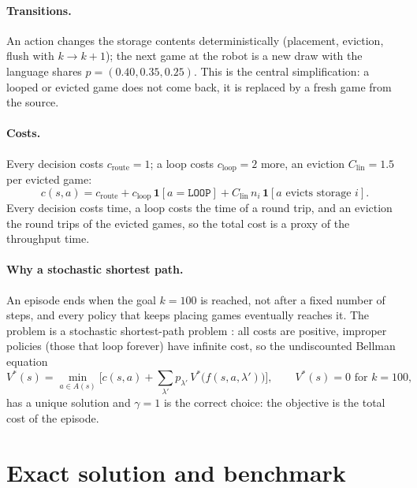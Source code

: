 \documentclass[11pt,a4paper]{article}
\begin{document}
\paragraph{Transitions.} An action changes the storage contents deterministically (placement, eviction, flush with
$k \to k+1$); the next game at the robot is a new draw with the language shares $p = (0.40, 0.35, 0.25)$. This is the
central simplification: a looped or evicted game does not come back, it is replaced by a fresh game from the
source.

\paragraph{Costs.} Every decision costs $c_\text{route} = 1$; a loop costs $c_\text{loop} = 2$ more, an eviction
$C_\text{lin} = 1.5$ per evicted game:
\begin{equation}
  c(s,a) = c_\text{route} + c_\text{loop}\,\mathbf 1[a = \texttt{LOOP}]
         + C_\text{lin}\, n_i\, \mathbf 1[a \text{ evicts storage } i].
\end{equation}
Every decision costs time, a loop costs the time of a round trip, and an eviction the round trips of the evicted
games, so the total cost is a proxy of the throughput time.

\paragraph{Why a stochastic shortest path.} An episode ends when the goal $k = 100$ is reached, not after a fixed
number of steps, and every policy that keeps placing games eventually reaches it. The problem is a stochastic
shortest-path problem \citep{Bertsekas1991}: all costs are positive, improper policies (those that loop forever)
have infinite cost, so the undiscounted Bellman equation
\begin{equation}
  V^*(s) = \min_{a \in A(s)} \Big[c(s,a) + \sum_{\lambda'} p_{\lambda'}\, V^*\big(f(s,a,\lambda')\big)\Big],
  \qquad V^*(s) = 0 \text{ for } k = 100,
\end{equation}
has a unique solution and $\gamma = 1$ is the correct choice: the objective is the total cost of the episode.

\section{Exact solution and benchmark}
\end{document}
